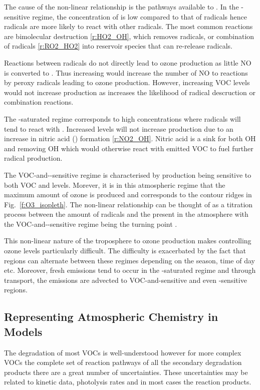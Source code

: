The cause of the non-linear relationship is the pathways available to .
In the -sensitive regime, the concentration of  is low compared to that of radicals hence radicals are more likely to react with other radicals. 
The most common reactions are bimolecular destruction \eqref{r:HO2_OH}, which removes radicals, or combination of radicals \eqref{r:RO2_HO2} into reservoir species that can re-release radicals.

Reactions between radicals do not directly lead to ozone production as little NO is converted to .
Thus increasing  would increase the number of NO to  reactions by peroxy radicals leading to ozone production.
However, increasing VOC levels would not increase  production as increases the likelihood of radical descruction or combination reactions.

The -saturated regime corresponds to high  concentrations where radicals will tend to react with . 
Increased  levels will not increase  production due to an increase in nitric acid () formation \eqref{r:NO2_OH}.
Nitric acid is a sink for both OH and  removing OH which would otherwise react with emitted VOC to fuel further radical production.

The VOC-and--sensitive regime is characterised by  production being sensitive to both VOC and  levels. 
Morever, it is in this atmospheric regime that the maximum amount of ozone is produced and corresponds to the contour ridges in Fig.~\ref{f:O3_isopleth}.
The non-linear relationship can be thought of as a titration process between the amount of radicals and the  present in the atmosphere with the VOC-and--sensitive regime being the turning point \citep{Kleinman:1991, Kleinman:1994}.

This non-linear nature of the troposphere to ozone production makes controlling ozone levels particularly difficult.
The difficulty is exacerbated by the fact that regions can alternate between these regimes depending on the season, time of day etc.
Moreover, fresh emissions tend to occur in the -saturated regime and through transport, the emissions are advected to VOC-and-sensitive and even -sensitive regions.

\subsection{Representing Atmospheric Chemistry in Models} \label{ss:chemistry_models}
The degradation of most VOCs is well-understood however for more complex VOCs the complete set of reaction pathways of all the secondary degradation products there are a great number of uncertainties. 
These uncertainties may be related to kinetic data, photolysis rates and in most cases the reaction products.

